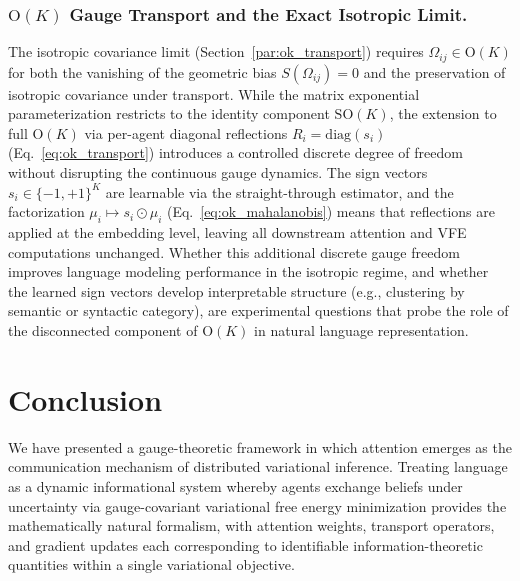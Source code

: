 \documentclass[twoside,11pt]{article}
\begin{document}
\subsubsection{$\mathrm{O}(K)$ Gauge Transport and the Exact Isotropic Limit.}

The isotropic covariance limit (Section~\ref{par:ok_transport}) requires $\Omega_{ij} \in \mathrm{O}(K)$ for both the vanishing of the geometric bias $S(\Omega_{ij}) = 0$ and the preservation of isotropic covariance under transport.  While the matrix exponential parameterization restricts to the identity component $\mathrm{SO}(K)$, the extension to full $\mathrm{O}(K)$ via per-agent diagonal reflections $R_i = \mathrm{diag}(s_i)$ (Eq.~\ref{eq:ok_transport}) introduces a controlled discrete degree of freedom without disrupting the continuous gauge dynamics.  The sign vectors $s_i \in \{-1,+1\}^K$ are learnable via the straight-through estimator, and the factorization $\mu_i \mapsto s_i \odot \mu_i$ (Eq.~\ref{eq:ok_mahalanobis}) means that reflections are applied at the embedding level, leaving all downstream attention and VFE computations unchanged.  Whether this additional discrete gauge freedom improves language modeling performance in the isotropic regime, and whether the learned sign vectors develop interpretable structure (e.g., clustering by semantic or syntactic category), are experimental questions that probe the role of the disconnected component of $\mathrm{O}(K)$ in natural language representation.

\section{Conclusion}

We have presented a gauge-theoretic framework in which attention emerges as the communication mechanism of distributed variational inference. Treating language as a dynamic informational system whereby agents exchange beliefs under uncertainty via gauge-covariant variational free energy minimization provides the mathematically natural formalism, with attention weights, transport operators, and gradient updates each corresponding to identifiable information-theoretic quantities within a single variational objective.
\end{document}
